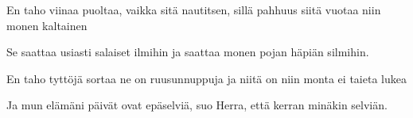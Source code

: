 	
\beginverse*						
En taho viinaa puoltaa, vaikka sitä nautitsen,
sillä pahhuus siitä vuotaa niin monen kaltainen
\endverse						

\beginverse				
Se saattaa usiasti salaiset ilmihin
ja saattaa monen pojan häpiän silmihin.
\endverse	

\beginverse				
En taho tyttöjä sortaa ne on ruusunnuppuja
ja niitä on niin monta ei taieta lukea
\endverse

\beginverse				
Ja mun elämäni päivät ovat epäselviä,
suo Herra, että kerran minäkin selviän.
\endverse			
\endsong		
